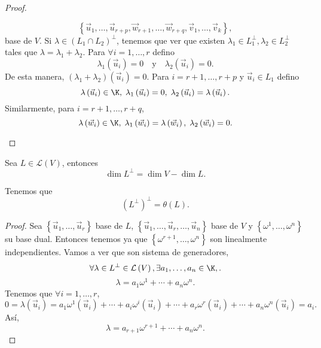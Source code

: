 \begin{proof}
\begin{description}
	\[  \left\{ \vec{u}_{1}, \ldots, \vec{u}_{r+p}, \vec{w}_{r+1}, \ldots, \vec{w}_{r+q}, \vec{v}_{1}, \ldots, \vec{v}_{k}\right\}, \]
	base de $\displaystyle V $. Si $\displaystyle \lambda \in \left(L_{1}\cap L_{2}\right)^{\perp}$, tenemos que ver que existen $\displaystyle \lambda_{1} \in L_{1}^{\perp}, \lambda_{2}\in L_{2}^{\perp} $ tales que $\displaystyle \lambda = \lambda_{1} + \lambda_{2} $. Para $\displaystyle \forall i = 1, \ldots, r $ defino 
	\[\lambda_{1}\left(\vec{u}_{i}\right) = 0 \quad \text{y} \quad \lambda_{2}\left(\vec{u}_{i}\right) = 0 .\]
De esta manera, $\displaystyle \left(\lambda_{1}+\lambda_{2}\right)\left(\vec{u}_{i}\right) = 0 $. Para $\displaystyle i = r+1, \ldots, r+p $ y $\displaystyle \vec{u}_{i} \in L_{1} $ defino
\[\lambda\left(\vec{u}_{i}\right) \in \K, \;  \lambda_{1}\left(\vec{u}_{i}\right) = 0, \; \lambda_{2}\left(\vec{u}_{i}\right) = \lambda\left(\vec{u}_{i}\right) .\]
Similarmente, para $\displaystyle i = r+1, \ldots, r+q $, 
\[\lambda\left(\vec{w}_{i}\right) \in \K, \; \lambda_{1}\left(\vec{w}_{i}\right) = \lambda\left(\vec{w}_{i}\right), \; \lambda_{2}\left(\vec{w}_{i}\right) = 0 .\]
\end{description}
\end{proof}

\begin{ftheorem}[]
\normalfont Sea $\displaystyle L \in \mathcal{L}\left(V\right) $, entonces 
\[\dim L^{\perp} = \dim V - \dim L .\]
\end{ftheorem}

\begin{observation}
\normalfont Tenemos que 
\[\left(L^{\perp}\right)^{\perp} = \theta\left(L\right) .\]
\end{observation}

\begin{proof}
	Sea $\displaystyle \left\{\vec{u}_{1}, \ldots, \vec{u}_{r} \right\}  $ base de $\displaystyle L $, $\displaystyle \left\{ \vec{u}_{1}, \ldots, \vec{u}_{r}, \ldots, \vec{u}_{n}\right\}  $ base de $\displaystyle V $ y $\displaystyle \left\{ \omega^{1}, \ldots, \omega^{n}\right\}  $ su base dual. Entonces tenemos ya que $\displaystyle \left\{ \omega^{r+1}, \ldots, \omega^{n}\right\}  $ son linealmente independientes. Vamos a ver que son sistema de generadores, 
	\[\forall \lambda \in L^{\perp} \in \mathcal{L}\left(V\right), \exists a_{1}, \ldots, a_{n} \in \K, .\]
	\[\lambda = a_{1}\omega^{1} + \cdots + a_{n}\omega^{n} .\]
Tenemos que $\displaystyle \forall i = 1, \ldots, r $, 
\[0 = \lambda\left(\vec{u}_{i}\right) = a_{1}\omega^{1}\left(\vec{u}_{i}\right)+ \cdots + a_{i}\omega^{i}\left(\vec{u}_{i}\right) + \cdots + a_{r}\omega^{r}\left(\vec{u}_{i}\right) + \cdots + a_{n}\omega^{n}\left(\vec{u}_{i}\right) = a_{i} .\]
Así, 
\[\lambda = a_{r+1}\omega^{r+1} + \cdots + a_{n}\omega^{n} .\]
\end{proof}

